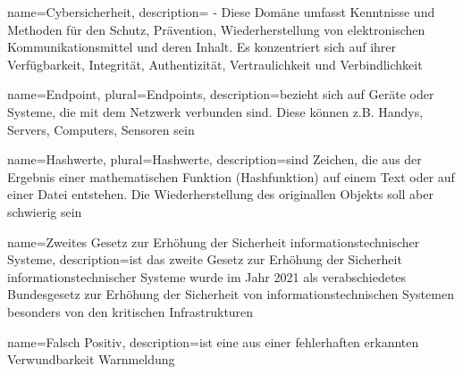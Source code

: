 
 {
    name={Cybersicherheit},
    description={ - Diese Domäne umfasst Kenntnisse und Methoden für den Schutz, Prävention, Wiederherstellung von elektronischen Kommunikationsmittel und deren Inhalt. Es konzentriert sich auf ihrer Verfügbarkeit, Integrität, Authentizität, Vertraulichkeit und Verbindlichkeit \citep{NIST_Definitions}}}

 {
    name={Endpoint},
    plural={Endpoints},
    description={bezieht sich auf Geräte oder Systeme, die mit dem Netzwerk verbunden sind. Diese können z.B. Handys, Servers, Computers, Sensoren sein \citep{Microsoft_Endpoint}}}

 {
    name={Hashwerte},
    plural={Hashwerte},
    description={sind Zeichen, die aus der Ergebnis einer mathematischen Funktion (Hashfunktion) auf einem Text oder auf einer Datei entstehen. Die Wiederherstellung des originallen Objekts soll aber schwierig sein \citep{Wendzel_IS}}}


 {
    name={Zweites Gesetz zur Erhöhung der Sicherheit informationstechnischer Systeme},
    description={ist das zweite Gesetz zur Erhöhung der Sicherheit informationstechnischer Systeme wurde im Jahr 2021 als verabschiedetes Bundesgesetz zur Erhöhung der Sicherheit von informationstechnischen Systemen besonders von den kritischen Infrastrukturen \citep{Harmes_ITSG}}}

 {
    name={Falsch Positiv},
    description={ist eine aus einer fehlerhaften erkannten Verwundbarkeit Warnmeldung \citep{NIST_Definitions}}}


